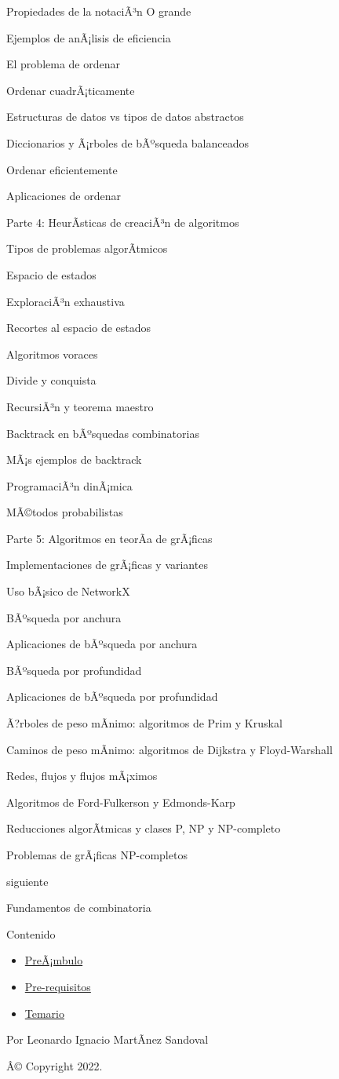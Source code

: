 \documentclass[
]{article}
\providecommand{\tightlist}{%
  \setlength{\itemsep}{0pt}\setlength{\parskip}{0pt}}
\begin{document}
Propiedades de la notaciÃ³n O grande

Ejemplos de anÃ¡lisis de eficiencia

El problema de ordenar

Ordenar cuadrÃ¡ticamente

Estructuras de datos vs tipos de datos abstractos

Diccionarios y Ã¡rboles de bÃºsqueda balanceados

Ordenar eficientemente

Aplicaciones de ordenar

Parte 4: HeurÃ­sticas de creaciÃ³n de algoritmos

Tipos de problemas algorÃ­tmicos

Espacio de estados

ExploraciÃ³n exhaustiva

Recortes al espacio de estados

Algoritmos voraces

Divide y conquista

RecursiÃ³n y teorema maestro

Backtrack en bÃºsquedas combinatorias

MÃ¡s ejemplos de backtrack

ProgramaciÃ³n dinÃ¡mica

MÃ©todos probabilistas

Parte 5: Algoritmos en teorÃ­a de grÃ¡ficas

Implementaciones de grÃ¡ficas y variantes

Uso bÃ¡sico de NetworkX

BÃºsqueda por anchura

Aplicaciones de bÃºsqueda por anchura

BÃºsqueda por profundidad

Aplicaciones de bÃºsqueda por profundidad

Ã?rboles de peso mÃ­nimo: algoritmos de Prim y Kruskal

Caminos de peso mÃ­nimo: algoritmos de Dijkstra y Floyd-Warshall

Redes, flujos y flujos mÃ¡ximos

Algoritmos de Ford-Fulkerson y Edmonds-Karp

Reducciones algorÃ­tmicas y clases P, NP y NP-completo

Problemas de grÃ¡ficas NP-completos

\href{P1/IntroCombinatoria.html}{}

siguiente

Fundamentos de combinatoria

\emph{}

\emph{} Contenido

\begin{itemize}
\tightlist
\item
  \hyperref[preambulo]{PreÃ¡mbulo}
\item
  \hyperref[pre-requisitos]{Pre-requisitos}
\item
  \hyperref[temario]{Temario}
\end{itemize}

Por Leonardo Ignacio MartÃ­nez Sandoval

Â© Copyright 2022.\\
\end{document}
